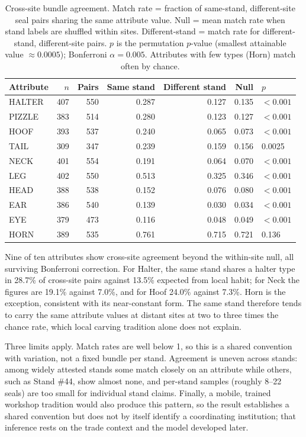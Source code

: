 \documentclass[12pt]{article}
\begin{document}
\begin{table}[H]
\centering
\caption{Cross-site bundle agreement. Match rate = fraction of same-stand,
different-site seal pairs sharing the same attribute value. Null = mean match
rate when stand labels are shuffled within sites. Different-stand = match rate for
different-stand, different-site pairs. $p$ is the permutation $p$-value
(smallest attainable value $\approx 0.0005$); Bonferroni $\alpha = 0.005$.
Attributes with few types (Horn) match often by chance.}
\label{tab:cross_site}
\begin{tabular}{@{}lrrrrrl@{}}
\toprule
Attribute & $n$ & Pairs & Same stand & Different stand & Null & $p$ \\
\midrule
HALTER & 407 & 550 & 0.287 & 0.127 & 0.135 & $<0.001$ \\
PIZZLE & 383 & 514 & 0.280 & 0.123 & 0.127 & $<0.001$ \\
HOOF   & 393 & 537 & 0.240 & 0.065 & 0.073 & $<0.001$ \\
TAIL   & 309 & 347 & 0.239 & 0.159 & 0.156 & 0.0025 \\
NECK   & 401 & 554 & 0.191 & 0.064 & 0.070 & $<0.001$ \\
LEG    & 402 & 550 & 0.513 & 0.325 & 0.346 & $<0.001$ \\
HEAD   & 388 & 538 & 0.152 & 0.076 & 0.080 & $<0.001$ \\
EAR    & 386 & 540 & 0.139 & 0.030 & 0.034 & $<0.001$ \\
EYE    & 379 & 473 & 0.116 & 0.048 & 0.049 & $<0.001$ \\
HORN   & 389 & 535 & 0.761 & 0.715 & 0.721 & 0.136 \\
\bottomrule
\end{tabular}
\end{table}

Nine of ten attributes show cross-site agreement beyond the within-site null,
all surviving Bonferroni correction. For Halter, the same stand shares a halter
type in 28.7\% of cross-site pairs against 13.5\% expected from local habit; for
Neck the figures are 19.1\% against 7.0\%, and for Hoof 24.0\% against 7.3\%. Horn
is the exception, consistent with its near-constant form. The same stand therefore
tends to carry the same attribute values at distant sites at two to three times the
chance rate, which local carving tradition alone does not explain.

Three limits apply. Match rates are well below 1, so this is a shared convention
with variation, not a fixed bundle per stand. Agreement is uneven across stands:
among widely attested stands some match closely on an attribute while others,
such as Stand \#44, show almost none, and per-stand samples (roughly 8--22 seals)
are too small for individual stand claims. Finally, a mobile, trained workshop
tradition would also produce this pattern, so the result establishes a shared
convention but does not by itself identify a coordinating institution; that
inference rests on the trade context and the model developed later.
\end{document}
